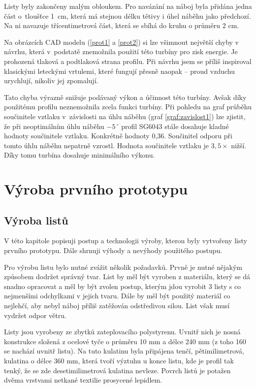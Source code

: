 Listy byly zakončeny malým obloukem. Pro navázání na náboj byla přidána jedna část o~tloušťce 1~cm, která má stejnou délku tětivy i úhel náběhu jako předchozí. Na ni navazuje třícentimetrová část, která se sbíhá do kruhu o průměru 2 cm.

Na obrázcích CAD modelu (\ref{prot1} a \ref{prot2}) si lze všimnout největší chyby v návrhu, která v~podstatě znemožnila použití této turbíny pro zisk energie. Je prohozená tlaková a podtlaková strana profilu. Při návrhu jsem se příliš inspiroval klasickými leteckými vrtulemi, které fungují přesně naopak – proud vzduchu urychlují, nikoliv jej zpomalují.

Tato chyba výrazně snižuje podávaný výkon a účinnost této turbíny. Avšak díky použitému profilu neznemožnila zcela funkci turbíny. Při pohledu na graf průběhu součinitele vztlaku v~závislosti na úhlu náběhu (graf \ref{graf:zavislost1}) lze zjistit, že při neoptimálním úhlu náběhu $-5\,^{\circ}$ profil SG6043 stále dosahuje kladné hodnoty součinitele vztlaku. Konkrétně hodnoty 0,36. Součinitel odporu při tomto úhlu náběhu nepatrně vzrostl. Hodnota součinitele vztlaku je $3,5\times$ nižší. Díky tomu turbína dosahuje minimálního výkonu. 






\chapter{Výroba prvního prototypu}
\section{Výroba listů}
V této kapitole popisuji postup a technologii výroby, kterou byly vytvořeny listy prvního prototypu. Dále shrnuji výhody a nevýhody použitého postupu.

Pro výrobu listu bylo nutné zvážit několik požadavků. Prvně je nutné nějakým způsobem dodržet správný tvar. List by měl být vyroben z materiálu, který se dá snadno opracovat a měl by být zvolen postup, kterým jdou vyrobit 3 listy s co nejmenšími odchylkami v jejich tvaru. Dále by měl být použitý materiál co nejlehčí, aby nebyl náboj příliš zatěžován odstředivou silou. List však musí vydržet odpor větru.

Listy jsou vyrobeny ze zbytků zateplovacího polystyrenu. Uvnitř nich je nosná konstrukce složená z ocelové tyče o průměru 10 mm a délce 240 mm (z toho 160 se nachází uvnitř listu). Na tuto kulatinu byla připájena tenčí, pětimilimetrová, kulatina o délce 360 mm, která tvoří výztuhu u konce listu, kde je profil tak tenký, že se zde desetimilimetrová kulatina nevleze. Povrch listů je potažen dvěma vrstvami netkané textilie prosycené lepidlem.


